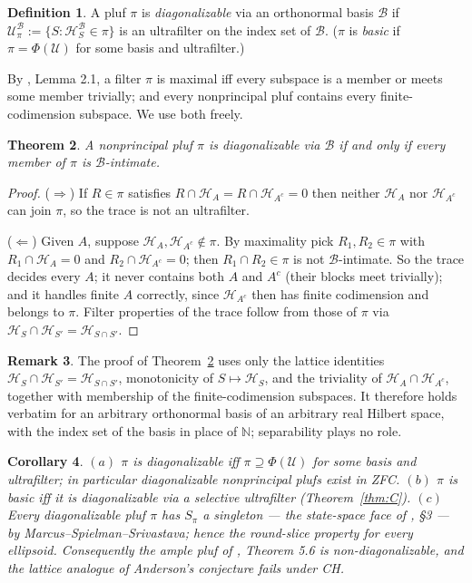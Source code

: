 \documentclass[11pt,reqno]{amsart}
\newtheorem{theorem}{Theorem}[section]
\newtheorem{corollary}[theorem]{Corollary}
\theoremstyle{definition}
\newtheorem{definition}[theorem]{Definition}
\newtheorem{remark}[theorem]{Remark}
\newcommand{\HH}{\mathcal{H}}
\newcommand{\N}{\mathbb{N}}
\newcommand{\U}{\mathcal{U}}
\newcommand{\pluf}{\pi}
\begin{document}
\begin{definition}
A pluf $\pluf$ is \emph{diagonalizable} via an orthonormal basis $\mathcal B$ if
$\U^{\mathcal B}_\pluf:=\{S:\HH^{\mathcal B}_S\in\pluf\}$ is an ultrafilter on the index
set of $\mathcal B$. ($\pluf$ is \emph{basic} if $\pluf=\Phi(\U)$ for some basis and
ultrafilter.)
\end{definition}

By \cite{FWI}, Lemma 2.1, a filter $\pluf$ is maximal iff every subspace is a member or
meets some member trivially; and every nonprincipal pluf contains every
finite-codimension subspace. We use both freely.

\begin{theorem}\label{thm:D}
A nonprincipal pluf $\pluf$ is diagonalizable via $\mathcal B$ if and only if every
member of $\pluf$ is $\mathcal B$-intimate.
\end{theorem}

\begin{proof}
($\Rightarrow$) If $R\in\pluf$ satisfies $R\cap\HH_A=R\cap\HH_{A^c}=0$ then neither
$\HH_A$ nor $\HH_{A^c}$ can join $\pluf$, so the trace is not an ultrafilter.

($\Leftarrow$) Given $A$, suppose $\HH_A,\HH_{A^c}\notin\pluf$. By maximality pick
$R_1,R_2\in\pluf$ with $R_1\cap\HH_A=0$ and $R_2\cap\HH_{A^c}=0$; then
$R_1\cap R_2\in\pluf$ is not $\mathcal B$-intimate. So the trace decides every $A$; it
never contains both $A$ and $A^c$ (their blocks meet trivially); and it handles finite
$A$ correctly, since $\HH_{A^c}$ then has finite codimension and belongs to $\pluf$.
Filter properties of the trace follow from those of $\pluf$ via
$\HH_S\cap\HH_{S'}=\HH_{S\cap S'}$.
\end{proof}

\begin{remark}\label{rem:Dgeneral}
The proof of Theorem~\ref{thm:D} uses only the lattice identities
$\HH_S\cap\HH_{S'}=\HH_{S\cap S'}$, monotonicity of $S\mapsto\HH_S$, and the triviality
of $\HH_A\cap\HH_{A^c}$, together with membership of the finite-codimension subspaces.
It therefore holds verbatim for an arbitrary orthonormal basis of an arbitrary real
Hilbert space, with the index set of the basis in place of $\N$; separability plays no
role.
\end{remark}

\begin{corollary}\label{cor:diag-facts}
$(a)$ $\pluf$ is diagonalizable iff $\pluf\supseteq\Phi(\U)$ for some basis and
ultrafilter; in particular diagonalizable nonprincipal plufs exist in ZFC.
$(b)$ $\pluf$ is basic iff it is diagonalizable via a selective ultrafilter
(Theorem~\ref{thm:C}).
$(c)$ Every diagonalizable pluf $\pluf$ has $S_\pluf$ a singleton --- the state-space
face of \cite{FWI}, \S3 --- by Marcus--Spielman--Srivastava; hence the round-slice
property for every ellipsoid. Consequently the ample pluf of \cite{FWI}, Theorem 5.6 is
non-diagonalizable, and the lattice analogue of Anderson's conjecture \cite{Anderson81}
fails under CH.
\end{corollary}
\end{document}
